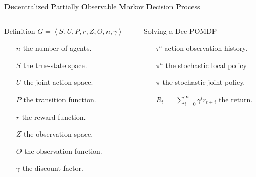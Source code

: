 \documentclass{beamer}
\begin{document}
    \begin{frame}{\textbf{Dec}entralized \textbf{P}artially \textbf{O}bservable \textbf{M}arkov \textbf{D}ecision \textbf{P}rocess}


        \begin{columns}
            \pause
            \begin{column}{0.45\textwidth}
                \begin{block}{Definition}
                    $G=\left\langle S,U,P,r,Z,O,n,\gamma\right\rangle$
                    \begin{itemize}
                        \item[$n$] the number of agents.
                        \item[$S$] the true-state space.
                        \item[$U$] the joint action space.
                        \item[$P$] the transition function.
                        \item[$r$] the reward function.
                        \item[$Z$] the observation space.
                        \item[$O$] the observation function.
                        \item[$\gamma$] the discount factor.
                    \end{itemize}
                \end{block}
            \end{column}
            \pause
            \begin{column}{0.50\textwidth}
                \begin{block}{Solving a Dec-POMDP}
                    \begin{itemize}
                        \item[$\tau^a$] action-observation history.
                        \item[$\pi^a$] the stochastic local policy
                        \item[$\pi$] the stochastic joint policy.
                        \item[$R_t$] $=\sum^{\infty}_{i=0}\gamma^ir_{t+i}$ the return.
                    \end{itemize}
                \end{block}
            \end{column}
        \end{columns}

    \end{frame}
\end{document}
